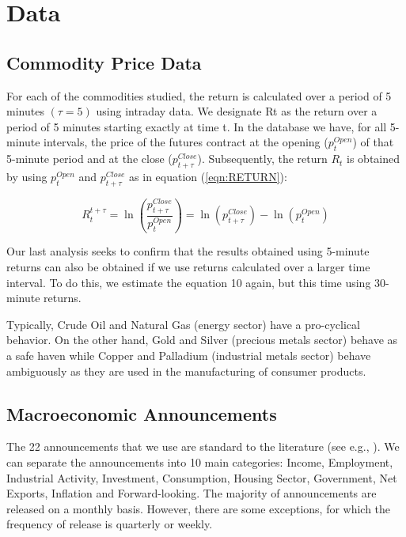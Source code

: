 \documentclass[12pt]{article}
\begin{document}
\section{Data}
\subsection{Commodity Price Data}
For each of the commodities studied, the return is calculated over a period of 5 minutes $(\tau=5)$ using intraday data. We designate Rt as the return over a period of 5 minutes starting exactly at time t. In the database we have, for all 5-minute intervals, the price of the futures contract at the opening ($p_{t}^{Open}$) of that 5-minute period and at the close ($p_{t+\tau}^{Close}$). Subsequently, the return $R_t$ is obtained by using $p_{t}^{Open}$ and $p_{t+\tau}^{Close}$ as in equation (\ref{eqn:RETURN}):

\begin{equation}\label{eqn:RETURN}
R_t^{t+\tau}=\ln \left( \frac{p_{t+\tau}^{Close}}{p_{t}^{Open}} \right)=\ln (p_{t+\tau}^{Close})-\ln(p_{t}^{Open})
\end{equation}

Our last analysis seeks to confirm that the results obtained using 5-minute returns can also be obtained if we use returns calculated over a larger time interval. To do this, we estimate the equation 10 again, but this time using 30-minute returns.

Typically, Crude Oil and Natural Gas (energy sector) have a pro-cyclical behavior. On the other hand, Gold and Silver (precious metals sector) behave as a safe haven while Copper and Palladium (industrial metals sector) behave ambiguously as they are used in the manufacturing of consumer products.

\subsection{Macroeconomic Announcements}
 
The 22  announcements that we use are standard to the literature (see e.g.,  \citep{kurov2019price}). We can separate the announcements into 10 main categories: Income, Employment, Industrial Activity, Investment, Consumption, Housing Sector, Government, Net Exports, Inflation and Forward-looking. The majority of announcements are released on a monthly basis. However, there are some exceptions, for which the frequency of release is quarterly or weekly.
\end{document}

